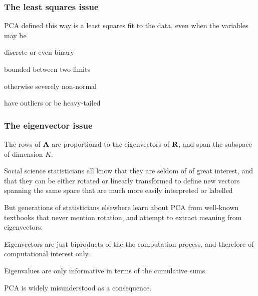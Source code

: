 \documentclass[11pt]{beamer}
\begin{document}

\begin{frame}

\frametitle{The least squares issue}

\bi
  \item PCA defined this way is a least squares fit to the data, even when the variables may be
  \bi
    \item discrete or even binary
    \item bounded between two limits
    \item otherwise severely non-normal
    \item have outliers or be heavy-tailed
  \ei

\ei

\end{frame}


\begin{frame}

\frametitle{The eigenvector issue}

\bi
  \item The rows of $\mbox{\bf A}$ are proportional to the eigenvectors of $\mbox{\bf R}$, and
  span the subspace of dimension $K$.
  \item Social science statisticians all know that they are seldom of of great interest,
  and that they can be either rotated or linearly transformed to define new vectors
  spanning the same space that are much more easily interpreted or labelled
  \item But generations of statisticians elsewhere learn about PCA from well-known textbooks that
  never mention rotation, and attempt to extract meaning from eigenvectors.
  \item Eigenvectors are just biproducts of the the computation process, and therefore of
  computational interest only.
  \item Eigenvalues are only informative in terms of the cumulative sums.
  \item PCA is widely misunderstood as a consequence.
\ei

\end{frame}

\end{document}
